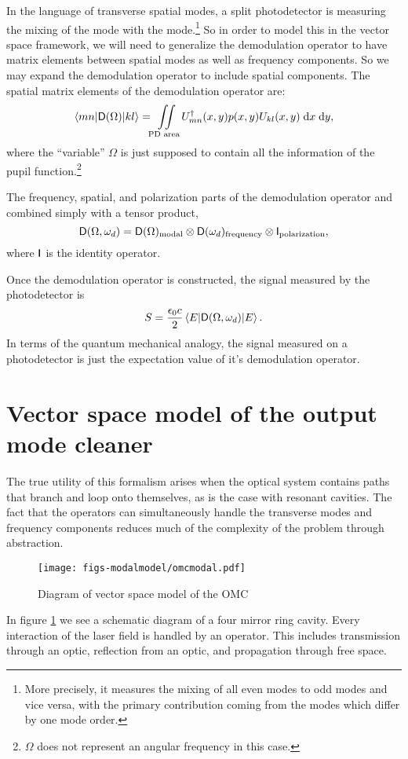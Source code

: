 
In the language of transverse spatial modes, a split photodetector is measuring the mixing of the  mode with the  mode.\footnote{More precisely, it measures the mixing of all even modes to odd modes and vice versa, with the primary contribution coming from the modes which differ by one mode order.} So in order to model this in the vector space framework, we will need to generalize the demodulation operator to have matrix elements between spatial modes as well as frequency components. %
So we may expand the demodulation operator to include spatial components. %
The spatial matrix elements of the demodulation operator are:
\begin{equation}
\matrixel{mn}{\oper{D}(\Omega)}{kl}=\iint\limits_{\text{PD area}}U_{mn}^\dagger(x,y)p(x,y)U_{kl}(x,y)\dd x \dd y,
\end{equation}
where the ``variable'' %
$\Omega$ is just supposed to contain all the information of the pupil function.\footnote{$\Omega$ does not represent an angular frequency in this case.}

The frequency, spatial, and polarization parts of the demodulation operator and combined simply with a tensor product,
\begin{equation}
\mathsf{D}(\Omega,\omega_d) = \mathsf{D}(\Omega)_{\text{modal}}\otimes\mathsf{D}(\omega_d)_{\text{frequency}}\otimes\mathsf{I}_{\text{polarization}},
\end{equation}
where $\mathsf{I}$ is the identity operator.

Once the demodulation operator is constructed, the signal measured by the photodetector is
\begin{equation}
S=\frac{\epsilon_0 c}{2}\matrixel{E}{\oper{D}(\Omega,\omega_d)}{E}.
\end{equation}
In terms of the quantum mechanical analogy, the signal measured on a photodetector is just the expectation value of it's demodulation operator.

\section{Vector space model of the output mode cleaner}
The true utility of this formalism arises when the optical system contains paths that branch and loop onto themselves, as is the case with resonant cavities. %
The fact that the operators can simultaneously handle the transverse modes and frequency components reduces much of the complexity of the problem through abstraction.
\begin{figure}
  \begin{center}
  \leavevmode
  \texttt{[image: figs-modalmodel/omcmodal.pdf]}
  \end{center}
  \caption[Diagram of vector space model of the OMC]{Diagram of vector space model of the OMC}
  \label{fig:omcmodal}
\end{figure}
In figure \ref{fig:omcmodal} we see a schematic diagram of a four mirror ring cavity. %
Every interaction of the laser field is handled by an operator. %
This includes transmission through an optic, reflection from an optic, and propagation through free space. %


